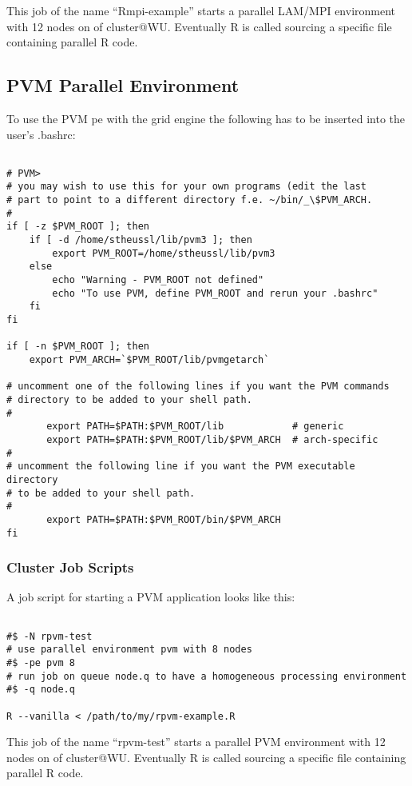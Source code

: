 This job of the name ``Rmpi-example'' starts a parallel LAM/MPI environment
with 12 nodes on  of cluster@WU. Eventually R is
called sourcing a specific file containing parallel R code.

\subsection{PVM Parallel Environment}

To use the PVM pe with the grid engine the following has to be
inserted into the user's .bashrc:

\begin{verbatim}

# PVM>
# you may wish to use this for your own programs (edit the last
# part to point to a different directory f.e. ~/bin/_\$PVM_ARCH.
#
if [ -z $PVM_ROOT ]; then
    if [ -d /home/stheussl/lib/pvm3 ]; then
        export PVM_ROOT=/home/stheussl/lib/pvm3
    else
        echo "Warning - PVM_ROOT not defined"
        echo "To use PVM, define PVM_ROOT and rerun your .bashrc"
    fi
fi

if [ -n $PVM_ROOT ]; then
    export PVM_ARCH=`$PVM_ROOT/lib/pvmgetarch`

# uncomment one of the following lines if you want the PVM commands
# directory to be added to your shell path.
#
       export PATH=$PATH:$PVM_ROOT/lib            # generic
       export PATH=$PATH:$PVM_ROOT/lib/$PVM_ARCH  # arch-specific
#
# uncomment the following line if you want the PVM executable directory
# to be added to your shell path.
#
       export PATH=$PATH:$PVM_ROOT/bin/$PVM_ARCH
fi

\end{verbatim}


\subsubsection{Cluster Job Scripts}

A job script for starting a PVM application looks like this:

\begin{verbatim}

#$ -N rpvm-test
# use parallel environment pvm with 8 nodes
#$ -pe pvm 8 
# run job on queue node.q to have a homogeneous processing environment 
#$ -q node.q

R --vanilla < /path/to/my/rpvm-example.R

\end{verbatim}

This job of the name ``rpvm-test'' starts a parallel PVM environment 
with 12 nodes on  of cluster@WU. Eventually R is
called sourcing a specific file containing parallel R code.
